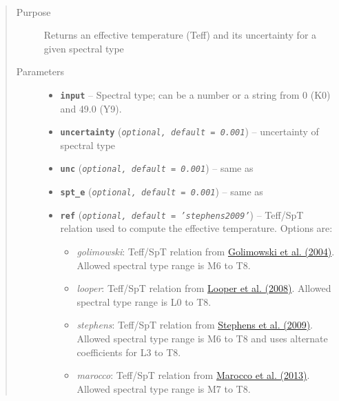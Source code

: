 \documentclass[letterpaper,10pt,english]{sphinxmanual}
\begin{document}

\begin{fulllineitems}
\label{api:splat.typeToTeff}~\begin{quote}\begin{description}
\item[{Purpose}] \leavevmode
Returns an effective temperature (Teff) and its uncertainty for a given spectral type

\item[{Parameters}] \leavevmode\begin{itemize}
\item {} 
\textbf{\texttt{input}} -- Spectral type; can be a number or a string from 0 (K0) and 49.0 (Y9).

\item {} 
\textbf{\texttt{uncertainty}} (\emph{\texttt{optional, default = 0.001}}) -- uncertainty of spectral type

\item {} 
\textbf{\texttt{unc}} (\emph{\texttt{optional, default = 0.001}}) -- same as 

\item {} 
\textbf{\texttt{spt\_e}} (\emph{\texttt{optional, default = 0.001}}) -- same as 

\item {} 
\textbf{\texttt{ref}} (\emph{\texttt{optional, default = 'stephens2009'}}) -- 
Teff/SpT relation used to compute the effective temperature. Options are:
\begin{itemize}
\item {} 
\emph{golimowski}: Teff/SpT relation from \href{http://adsabs.harvard.edu/abs/2004AJ....127.3516G}{Golimowski et al. (2004)}.
Allowed spectral type range is M6 to T8.

\item {} 
\emph{looper}: Teff/SpT relation from \href{http://adsabs.harvard.edu/abs/2008ApJ...685.1183L}{Looper et al. (2008)}.
Allowed spectral type range is L0 to T8.

\item {} 
\emph{stephens}: Teff/SpT relation from \href{http://adsabs.harvard.edu/abs/2009ApJ...702..154S}{Stephens et al. (2009)}.
Allowed spectral type range is M6 to T8 and uses alternate coefficients for L3 to T8.

\item {} 
\emph{marocco}: Teff/SpT relation from \href{http://adsabs.harvard.edu/abs/2013AJ....146..161M}{Marocco et al. (2013)}.
Allowed spectral type range is M7 to T8.


\end{itemize}
\end{itemize}
\end{description}
\end{quote}
\end{fulllineitems}
\end{document}
